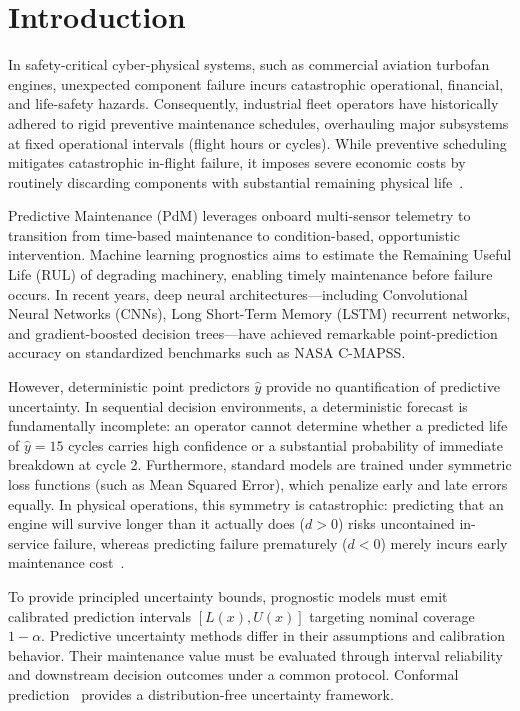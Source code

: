 \section{Introduction}
\label{sec:introduction}

In safety-critical cyber-physical systems, such as commercial aviation turbofan engines, unexpected component failure incurs catastrophic operational, financial, and life-safety hazards. Consequently, industrial fleet operators have historically adhered to rigid preventive maintenance schedules, overhauling major subsystems at fixed operational intervals (flight hours or cycles). While preventive scheduling mitigates catastrophic in-flight failure, it imposes severe economic costs by routinely discarding components with substantial remaining physical life~\cite{saxena2008damage,shehadeh2024evaluating}.

Predictive Maintenance (PdM) leverages onboard multi-sensor telemetry to transition from time-based maintenance to condition-based, opportunistic intervention. Machine learning prognostics aims to estimate the Remaining Useful Life (RUL) of degrading machinery, enabling timely maintenance before failure occurs. In recent years, deep neural architectures—including Convolutional Neural Networks (CNNs), Long Short-Term Memory (LSTM) recurrent networks, and gradient-boosted decision trees—have achieved remarkable point-prediction accuracy on standardized benchmarks such as NASA C-MAPSS.

However, deterministic point predictors $\hat{y}$ provide no quantification of predictive uncertainty. In sequential decision environments, a deterministic forecast is fundamentally incomplete: an operator cannot determine whether a predicted life of $\hat{y} = 15$ cycles carries high confidence or a substantial probability of immediate breakdown at cycle 2. Furthermore, standard models are trained under symmetric loss functions (such as Mean Squared Error), which penalize early and late errors equally. In physical operations, this symmetry is catastrophic: predicting that an engine will survive longer than it actually does ($d > 0$) risks uncontained in-service failure, whereas predicting failure prematurely ($d < 0$) merely incurs early maintenance cost~\cite{chen2022data,diao2026turbofan}.

To provide principled uncertainty bounds, prognostic models must emit calibrated prediction intervals $[L(x), U(x)]$ targeting nominal coverage $1 - \alpha$. Predictive uncertainty methods differ in their assumptions and calibration behavior. Their maintenance value must be evaluated through interval reliability and downstream decision outcomes under a common protocol. Conformal prediction~\cite{javanmardi2023conformal} provides a distribution-free uncertainty framework.

